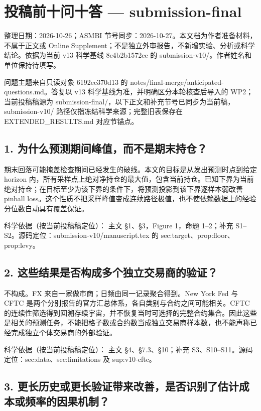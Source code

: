 \documentclass[11pt,a4paper]{article}
\begin{document}
\section*{投稿前十问十答 --- submission-final}

整理日期：2026-10-26；ASMBI 节号同步：2026-10-27。本文档为作者准备材料，不属于正文或 Online Supplement；不是独立外审报告，不新增实验、分析或科学结论。依据为当前 v13 科学基线 8c4b2b1572ee 的 submission-v10/。作者姓名和单位保持待填写。

问题主题来自只读对象 6192ec370d13 的 notes/final-merge/anticipated-questions.md。答复以 v13 科学基线为准，并明确区分本轮核查后导入的 WP2；当前投稿稿源为 submission-final/，以下正文和补充节号已同步为当前稿，submission-v10/ 路径仅指冻结科学来源；完整旧表保存在 EXTENDED\_RESULTS.md 对应节锚点。

\subsection*{1. 为什么预测期间峰值，而不是期末持仓？}

期末回落可能掩盖检查期间已经发生的破线。本文的目标是从发出预测时点到给定 horizon 内，所有采样点上绝对净持仓的最大值，包含当前持仓。已知下界为当前绝对持仓；在目标至少为该下界的条件下，将预测投影到该下界逐样本弱改善 pinball loss。这个性质不把采样峰值变成连续路径极值，也不使依赖数据上的经验分位数自动具有覆盖保证。

科学依据（按当前投稿稿定位）： 主文 §1、§3，Figure 1，命题 1--2；补充 S1--S2。源码定位：submission-v10/manuscript.tex 的 sec:target、prop:floor、prop:levy。

\subsection*{2. 这些结果是否构成多个独立交易商的验证？}

不构成。FX 来自一家做市商；日频由同一记录聚合得到。New York Fed 与 CFTC 是两个分别报告的官方汇总体系，各自类别与合约之间可能相关。CFTC 的连续性筛选得到回溯存续宇宙，并不恢复当时可选择的完整合约集合。因此这些是相关的预测任务，不能把格子数或合约数当成独立交易商样本数，也不能声称已经完成独立个体交易商的外部验证。

科学依据（按当前投稿稿定位）： 主文 §4、§7.3、§10；补充 S3、S10--S11。源码定位：sec:data、sec:limitations 及 sup:v10-cftc。

\subsection*{3. 更长历史或更长验证带来改善，是否识别了估计成本或频率的因果机制？}
\end{document}
